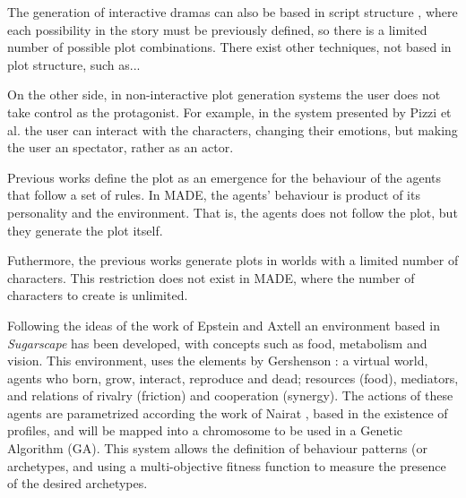 \documentclass[runningheads]{llncs}
\begin{document}
The generation of interactive dramas can also be based in script
structure \cite{ArchitectureYoung04}, where each possibility in the
story must be previously defined, so there is a limited number of
possible plot combinations. There exist other techniques, not based in
plot structure, such as... 



On the other side, in non-interactive plot generation systems the user does not take control as the protagonist. For example, in the system presented by Pizzi et al. \cite{pizzi2007interactive} the user can interact with the characters, changing their emotions, but making the user an spectator, rather as an actor.


Previous works define the plot as an emergence for the behaviour of the agents that follow a set of rules. In MADE, the agents' behaviour is product of its personality and the environment. That is, the agents does not follow the plot, but they generate the plot itself. %

Futhermore, the previous works generate plots in worlds with a limited number of characters. This restriction does not exist in MADE, where the number of characters to create is unlimited.






Following the ideas of the work of Epstein and Axtell \cite{epstein1996growing} an environment based in {\em Sugarscape} has been developed, with concepts such as food, metabolism and vision. This environment, uses the elements  by Gershenson \cite{gershenson2005general}: a virtual world, agents who born, grow, interact, reproduce and dead; resources (food), mediators, and relations of rivalry (friction) and cooperation (synergy). The actions of these agents are parametrized according the work of Nairat \cite{nairat2011character}, based in the existence of profiles, and will be mapped into a chromosome to be used in a Genetic Algorithm (GA). This system allows the definition of behaviour patterns (or archetypes, and using a multi-objective fitness function to measure the presence of the desired archetypes. %
\end{document}
